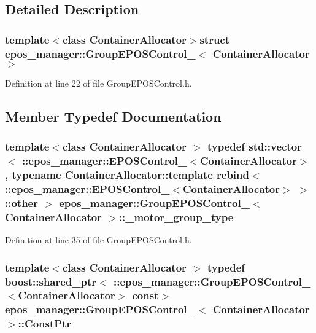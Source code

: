 \subsection{\-Detailed \-Description}
\subsubsection*{template$<$class Container\-Allocator$>$struct epos\-\_\-manager\-::\-Group\-E\-P\-O\-S\-Control\-\_\-$<$ Container\-Allocator $>$}



\-Definition at line 22 of file \-Group\-E\-P\-O\-S\-Control.\-h.



\subsection{\-Member \-Typedef \-Documentation}
\subsubsection[{\-\_\-motor\-\_\-group\-\_\-type}]{\setlength{\rightskip}{0pt plus 5cm}template$<$class Container\-Allocator $>$ typedef std\-::vector$<$ \-::{\bf epos\-\_\-manager\-::\-E\-P\-O\-S\-Control\-\_\-}$<$\-Container\-Allocator$>$ , typename \-Container\-Allocator\-::template rebind$<$ \-::{\bf epos\-\_\-manager\-::\-E\-P\-O\-S\-Control\-\_\-}$<$\-Container\-Allocator$>$ $>$\-::other $>$ {\bf epos\-\_\-manager\-::\-Group\-E\-P\-O\-S\-Control\-\_\-}$<$ \-Container\-Allocator $>$\-::{\bf \-\_\-motor\-\_\-group\-\_\-type}}\label{structepos__manager_1_1GroupEPOSControl___a598db1110a9fa89519f160d3822a4246}


\-Definition at line 35 of file \-Group\-E\-P\-O\-S\-Control.\-h.

\subsubsection[{\-Const\-Ptr}]{\setlength{\rightskip}{0pt plus 5cm}template$<$class Container\-Allocator $>$ typedef boost\-::shared\-\_\-ptr$<$ \-::{\bf epos\-\_\-manager\-::\-Group\-E\-P\-O\-S\-Control\-\_\-}$<$\-Container\-Allocator$>$ const$>$ {\bf epos\-\_\-manager\-::\-Group\-E\-P\-O\-S\-Control\-\_\-}$<$ \-Container\-Allocator $>$\-::{\bf \-Const\-Ptr}}\label{structepos__manager_1_1GroupEPOSControl___a1089e237a0adc3c56ca37511b4b8fa6d}


